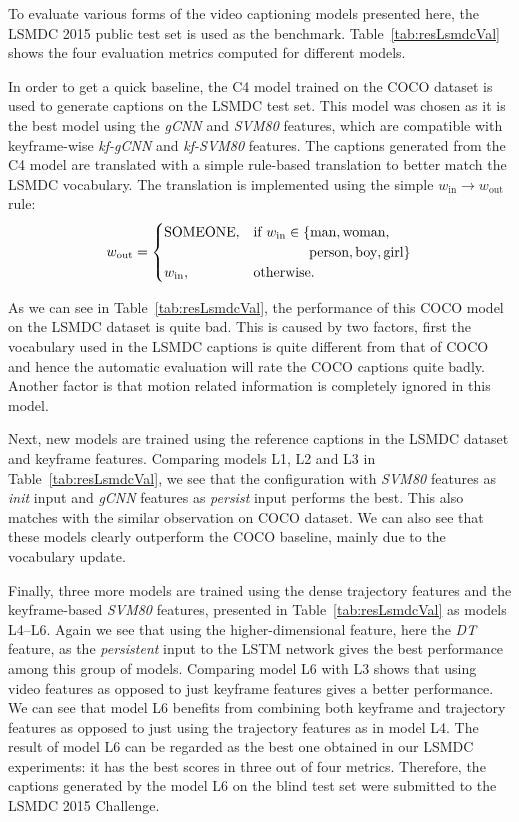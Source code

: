 To evaluate various forms of the video captioning models presented here,
the LSMDC 2015 public test set is used as the benchmark. 
Table~\ref{tab:resLsmdcVal} shows the four evaluation metrics computed for different
models.

In order to get a quick baseline, the C4 model trained on the COCO
dataset is used to generate captions on the LSMDC test set.
This model was chosen as it is the best model using the \emph{gCNN} and
\emph{SVM80} features, which are compatible with keyframe-wise \emph{kf-gCNN}
and \emph{kf-SVM80} features.
The captions generated from the C4 model are translated with a simple
rule-based translation to better match the LSMDC vocabulary.
The translation is implemented using the simple %
$w_{\text{in}} \longrightarrow w_{\text{out}}$ rule:
\begin{align} \label{eqTrans} w_{\text{out}} = \begin{cases} \text{SOMEONE},&
\text{if } w_{\text{in}} \in \{\text{man}, \text{woman}, \\&
\text{\mbox{\qquad\qquad person}}, \text{boy}, \text{girl} \}\\ w_{\text{in}},&
\text{otherwise.} \end{cases} \end{align}

As we can see in Table~\ref{tab:resLsmdcVal}, the performance of this COCO model
on the LSMDC dataset is quite bad.
This is caused by two factors, first the vocabulary used in the LSMDC captions is
quite different from that of COCO and hence the automatic evaluation will rate the
COCO captions quite badly.
Another factor is that motion related information is completely ignored in this
model.

Next, new models are trained using the reference captions in the LSMDC dataset and
keyframe features.
Comparing models L1, L2 and L3 in Table~\ref{tab:resLsmdcVal}, we see that the
configuration with \emph{SVM80} features as \emph{init} input and \emph{gCNN}
features as \emph{persist} input performs the best.
This also matches with the similar observation on COCO dataset.
We can also see that these models clearly outperform the COCO baseline, mainly
due to the vocabulary update.

Finally, three more models are trained using the dense trajectory features and the
keyframe-based \emph{SVM80} features, presented in Table~\ref{tab:resLsmdcVal}
as models L4--L6. 
Again we see that using the higher-dimensional feature, here the \emph{DT}
feature, as the \emph{persistent} input to the LSTM network gives the best
performance among this group of models.
Comparing model L6 with L3 shows that using video features as opposed to just
keyframe features gives a better performance.
We can see that model L6 benefits from combining both keyframe and trajectory
features as opposed to just using the trajectory features as in model L4.
The result of model L6 can be regarded as the best one obtained in our LSMDC
experiments: it has the best scores in three out of four metrics.
Therefore, the captions generated by the model L6 on the blind test set were
submitted to the LSMDC 2015 Challenge.

